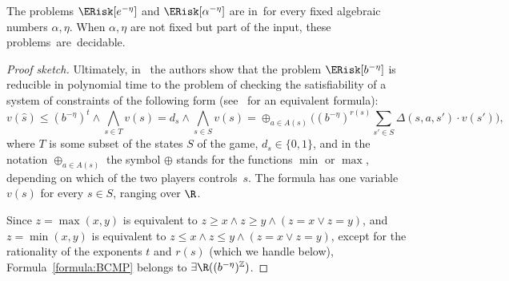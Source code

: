 \begin{theorem}
    \label{thoerem:Erisk}
    The problems $\ERisk[e^{-\eta}]$ and $\ERisk[\alpha^{-\eta}]$ are in~\exptime for every fixed algebraic numbers $\alpha,\eta$.
    When $\alpha,\eta$ are not fixed but part of the input, 
    these problems~are~decidable.
\end{theorem}

\begin{proof}[Proof sketch]
Ultimately, in~\cite{BaierCMP23} the authors show that the problem $\ERisk[b^{-\eta}]$ is reducible in polynomial time to the problem of checking the satisfiability of a system of constraints of the following form (see~\cite[Equation~7]{BaierCMP23} for an equivalent formula):
\vspace{-6pt}
\begin{equation}%
    \label{formula:BCMP}%
    v(\hat{s}) \leq (b^{-\eta})^{t}
    \land\!\! \bigwedge_{s \in T} v(s) = d_s
    \land\!\! \bigwedge_{s \in S} v(s) = \oplus_{a \in A(s)} \Big((b^{-\eta})^{r(s)} \sum_{s' \in S} \Delta(s,a,s') \cdot v(s')\Big),
\end{equation} 
where $T$ is some subset of the states $S$ of the game, $d_s \in \{0,1\}$, and in the notation $\oplus_{a \in
A(s)}$ the symbol $\oplus$ stands for the functions $\min$ or
$\max$, depending on which of the two players controls~$s$.
The formula has one variable $v(s)$
for every $s \in S$, ranging over $\R$.

Since $z = \max(x,y)$ is equivalent to $z \geq x
\land z \geq y \land (z = x \lor z = y)$, and $z = \min(x,y)$ is
equivalent to $z \leq x \land z \leq y \land (z = x \lor z = y)$, 
except for the rationality of the exponents $t$ and $r(s)$ (which we handle below),
Formula~\ref{formula:BCMP} belongs to $\exists \R((b^{-\eta})^{\mathbb{Z}})$.


\end{proof}
